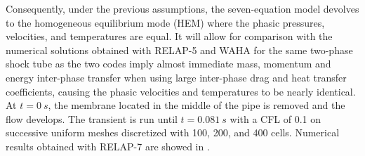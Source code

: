 \documentclass{inputs/mc2015}
\begin{document}
  Consequently, under the previous assumptions, the seven-equation model devolves to the homogeneous equilibrium mode (HEM) where the phasic pressures, velocities, and temperatures are equal. It will allow for comparison with the numerical solutions obtained with RELAP-5 \cite{Sokolowski-Koszela} and WAHA \cite{waha-manual} for the same two-phase shock tube as the two codes imply almost immediate mass, momentum and energy inter-phase transfer when using large inter-phase drag and heat transfer coefficients, causing the phasic velocities and temperatures to be nearly identical. 
 
At $t = 0\ s$, the membrane located in the middle of the pipe is removed and the flow develops. The transient is run until $t = 0.081\ s$ with a CFL of 0.1 on successive uniform meshes discretized with 100, 200, and 400 cells. Numerical results obtained with RELAP-7 are showed in .
\end{document}

